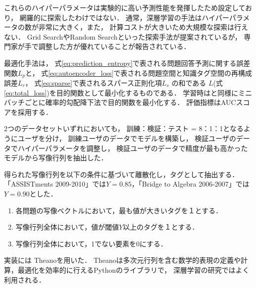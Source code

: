 これらのハイパーパラメータは実験的に高い予測性能を発揮したため設定しており，
網羅的に探索したわけではない．
通常，深層学習の手法はハイパーパラメータの数が非常に大きく，また，
計算コストが大きいため大規模な探索は行えない．
Grid SearchやRandom Search\cite{bergstra2012random}といった探索手法が提案されているが，
専門家が手で調整した方が優れていることが報告されている\cite{larochelle2007empirical, bergstra2012random}．

最適化手法は，
式\ref{eq:prediction_entropy}で表される問題回答予測に関する誤差関数$L_p$と，
式\ref{eq:autoencoder_loss}で表される問題空間と知識タグ空間の再構成誤差$L_r$，
式\ref{eq:sparse}で表されるスパース正則化項$L_s$
の和である
$L$(式\ref{eq:total_loss})を目的関数として最小化するものである．
学習時は\cite{piech2015deep}と同様にミニバッチごとに確率的勾配降下法で目的関数を最小化する．
評価指標はAUCスコアを採用する．

2つのデータセットいずれにおいても，
訓練：検証：テスト = 8：1：1となるようにユーザを分け，
訓練ユーザのデータでモデルを構築し，
検証ユーザのデータでハイパーパラメータを調整し， 
検証ユーザのデータで精度が最も高かったモデルから写像行列を抽出した．


得られた写像行列を以下の条件に基づいて離散化し，タグとして抽出する．
「ASSISTments 2009-2010」では$Y = 0.85$，「Bridge to Algebra 2006-2007」では$Y = 0.90$とした．
\begin{enumerate}
\item 各問題の写像ベクトルにおいて，最も値が大きいタグを１とする．
\item 写像行列全体において，値が閾値$Y$以上のタグを１とする．
\item 写像行列全体において，1でない要素を0にする．
\end{enumerate}

実装には
Theano\cite{bergstra+al:2010-scipy,Bastien-Theano-2012}を用いた．
Theanoは多次元行列を含む数学的表現の定義や計算，最適化を効率的に行えるPythonのライブラリで，
深層学習の研究ではよく利用される．


